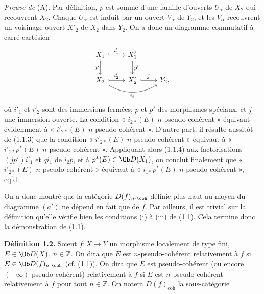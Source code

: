 \emph{Preuve de} (A). Par définition, \(p\) est somme d'une famille d'ouverts \(U_\alpha\) de \(X_2\) qui recouvrent \(X_2\). Chaque \(U_\alpha\) est induit par un ouvert \(V_\alpha\) de \(Y_2\), et les \(V_\alpha\) recouvrent un voisinage ouvert \(X'_2\) de \(X_2\) dans \(Y_2\). On a donc un diagramme commutatif à carré cartésien
\[
\begin{tikzcd}
X_1 \arrow[r,hook,"i'_1"] \arrow[d,"p"'] & X'_1 \arrow[d,"p'"]\\
X_2 \arrow[r,hook,"i'_2"] \arrow[rr,bend right,"i_2"'] & X'_2 \arrow[r,hook,"j"] & Y_2,
\end{tikzcd}
\]
où \(i'_1\) et \(i'_2\) sont des immersions fermées, \(p\) et \(p'\) des morphismes spéciaux, et \(j\) une immersion ouverte. La condition « \(i_{2*}(E)\) \(n\)-pseudo-cohérent » équivaut évidemment à « \(i'_{2*}(E)\) \(n\)-pseudo-cohérent ». D'autre part, il résulte aussitôt de (1.1.3) que la condition « \(i'_{2*}(E)\) \(n\)-pseudo-cohérent » équivaut à « \(i'_{1*}p^*(E)\) \(n\)-pseudo-cohérent ». Appliquant alors (1.1.4) aux factorisations \((jp')i'_1\) et \(qi_1\) de \(i_2p\), et à \(p^*(E)\in\Ob D(X_1)\), on conclut finalement que « \(i'_{2*}(E)\) \(n\)-pseudo-cohérent » équivaut à « \(i_{1*}p^*(E)\) \(n\)-pseudo-cohérent », cqfd.

On a donc montré que la catégorie \(D(f)_{n\text{-}\coh}\) définie plus haut au moyen du diagramme \((a')\) ne dépend en fait que de \(f\). Par ailleurs, il est trivial sur la définition qu'elle vérifie bien les conditions (i) à (iii) de (1.1). Cela termine donc la démonstration de (1.1).

\textbf{Définition 1.2.} Soient \(f:X\to Y\) un morphisme localement de type fini, \(E\in\Ob D(X)\), \(n\in\mathbb Z\). On dira que \(E\) est \(n\)-pseudo-cohérent relativement à \(f\) si \(E\in\Ob D(f)_{n\text{-}\coh}\) (cf. (1.1)). On dira que \(E\) est pseudo-cohérent (ou encore \((-\infty)\)-pseudo-cohérent) relativement à \(f\) si \(E\) est \(n\)-pseudo-cohérent relativement à \(f\) pour tout \(n\in\mathbb Z\). On notera \(D(f)_{\mathrm{coh}}\) la sous-catégorie
